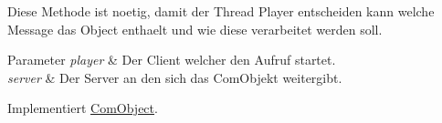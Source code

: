 Diese Methode ist noetig, damit der Thread Player entscheiden kann welche Message das Object enthaelt und wie diese verarbeitet werden soll. 


\begin{DoxyParams}{Parameter}
{\em player} & Der Client welcher den Aufruf startet. \\
\hline
{\em server} & Der Server an den sich das Com\-Objekt weitergibt. \\
\hline
\end{DoxyParams}


Implementiert \hyperlink{a00037_ac67b5ce3ec03d48ef1e6caad6e49c902}{Com\-Object}.

